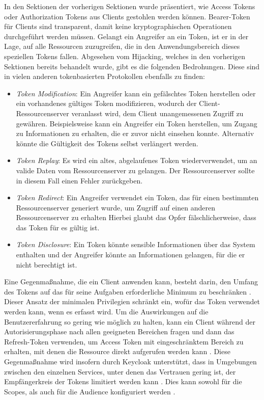 In den Sektionen der vorherigen Sektionen wurde präsentiert, wie Access Tokens oder Authorization Tokens aus Clients gestohlen werden können. Bearer-Token für Clients sind transparent, damit keine kryptographischen Operationen durchgeführt werden müssen. Gelangt ein Angreifer an ein Token, ist er in der Lage, auf alle Ressourcen zuzugreifen, die in den Anwendungsbereich dieses speziellen Tokens fallen. Abgesehen vom Hijacking, welches in den vorherigen Sektionen bereits behandelt wurde, gibt es die folgenden Bedrohungen. Diese sind in vielen anderen tokenbasierten Protokollen ebenfalls zu finden:

\begin{itemize}
	\item \textit{Token Modification}: Ein Angreifer kann ein gefälschtes Token herstellen oder ein vorhandenes gültiges Token modifizieren, wodurch der Client-Ressourcenserver veranlasst wird, dem Client unangemessenen Zugriff zu gewähren. Beispielsweise kann ein Angreifer ein Token herstellen, um Zugang zu Informationen zu erhalten, die er zuvor nicht einsehen konnte. Alternativ könnte die Gültigkeit des Tokens selbst verlängert werden. \cite{SSEB_RFC6750}
	
	\item \textit{Token Replay}: Es wird ein altes, abgelaufenes Token wiederverwendet, um an valide Daten vom Ressourcenserver zu gelangen. Der Ressourcenserver sollte in diesem Fall einen Fehler zurückgeben. \cite{SSEB_RFC6750}
	
	\item \textit{Token Redirect}: Ein Angreifer verwendet ein Token, das für einen bestimmten Ressourcenserver generiert wurde, um Zugriff auf einen anderen Ressourcenserver zu erhalten Hierbei glaubt das Opfer fälschlicherweise, dass das Token für es gültig ist. \cite{SSEB_RFC6750}
	
	\item \textit{Token Disclosure}: Ein Token könnte sensible Informationen über das System enthalten und der Angreifer könnte an Informationen gelangen, für die er nicht berechtigt ist. \cite{SSEB_RFC6750}
\end{itemize}

Eine Gegenmaßnahme, die ein Client anwenden kann, besteht darin, den Umfang des Tokens auf das für seine Aufgaben erforderliche Minimum zu beschränken \cite{SSEB_OAuthAuthorizationSecurityConsiderations}. Dieser Ansatz der minimalen Privilegien schränkt ein, wofür das Token verwendet werden kann, wenn es erfasst wird. Um die Auswirkungen auf die Benutzererfahrung so gering wie möglich zu halten, kann ein Client während der Autorisierungsphase nach allen geeigneten Bereichen fragen und dann das Refresh-Token verwenden, um Access Token mit eingeschränktem Bereich zu erhalten, mit denen die Ressource direkt aufgerufen werden kann \cite{SSEB_OAuthAuthorizationSecurityConsiderations}. Diese Gegenmaßnahme wird insofern durch Keycloak unterstützt, dass in Umgebungen zwischen den einzelnen Services, unter denen das Vertrauen gering ist, der Empfängerkreis der Tokens limitiert werden kann \cite[Sec. 19]{SSEB_keycloakDocs}. Dies kann sowohl für die Scopes, als auch für die Audience konfiguriert werden \cite[Sec. 19]{SSEB_keycloakDocs}.

